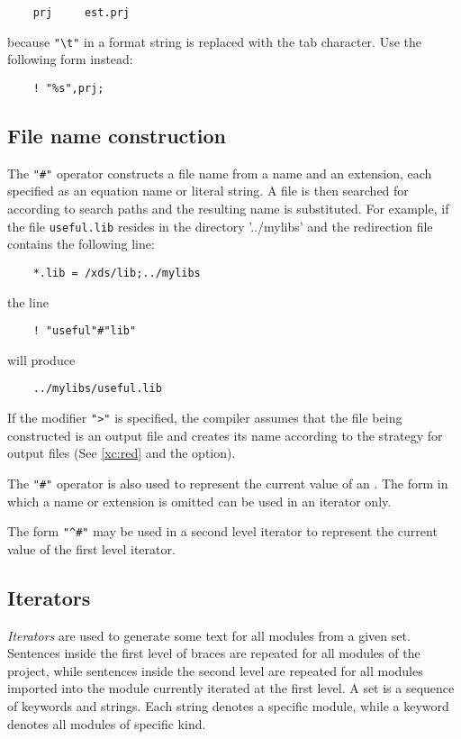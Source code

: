 \verb'    prj     est.prj'

because \verb'"\t"' in a format string is replaced with the tab character.
Use the following form instead:

\verb'    ! "%s",prj;'

\subsection{File name construction}\label{xc:template:fname}

The \verb|"#"| operator constructs a file name from a name and an
extension, each specified as an equation name or literal string.
A file is then searched for according to \XDS{} search paths
and the resulting name is substituted.
For example, if the file \verb'useful.lib' resides in the directory '../mylibs'
and the redirection file contains the following line:

\verb'    *.lib = /xds/lib;../mylibs'

the line

\verb'    ! "useful"#"lib"'

will produce

\verb'    ../mylibs/useful.lib'

If the modifier \verb|">"| is specified, the compiler assumes that the file
being constructed is an output file and creates its name according to the
strategy for output files (See \ref{xc:red} and the 
option).

The \verb'"#"' operator is also used to represent the current value of
an .
The form in which a name or extension is omitted can be used
in an iterator only.

The form \verb'"^#"' may be used in a second level iterator to represent
the current value of the first level iterator.

\subsection{Iterators}
\label{xc:template:iterators}

{\em Iterators} are used to generate some text for all modules from a given
set. Sentences inside the first level of braces are repeated
for all modules of the project, while sentences inside the second level are
repeated for all modules imported into the module currently iterated at
the first level. A set is a sequence of keywords and strings.
Each string denotes a specific module, while a keyword denotes all
modules of specific kind.

